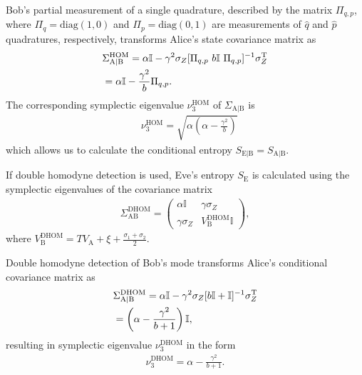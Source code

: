 \documentclass[%
reprint,
superscriptaddress,
 amsmath,amssymb,amsfonts,
 aps,
 pra,
 longbibliography
]{revtex4-2}
\newcommand{\ind}[1]{\mathrm{#1}}
\begin{document}
Bob’s partial measurement of a single quadrature, described by the matrix $\Pi_{q,p}$, where $\Pi_q=\ind{diag}(1,0)$ and $\Pi_p=\ind{diag}(0,1)$ are measurements of $\hat{q}$ and $\hat{p}$ quadratures, respectively, transforms Alice's state covariance matrix as~\cite{laudenbach2018continuous}
\begin{align}
    \label{eq:AB}
    &\Sigma_{\ind{A}|\ind{B}}^{\ind{HOM}}=\alpha\mathbb{I}-\gamma^2\sigma_Z[\Pi_{q,p}\ b\mathbb{I}\ \Pi_{q,p}]^{-1}\sigma_Z^{\ind T}\notag\\
    &=\alpha\mathbb{I}-\frac{\gamma^2}{b}\Pi_{q,p}.
\end{align}
The corresponding symplectic eigenvalue $\nu_3^{\ind{HOM}}$ of $\Sigma_{\ind{A}|\ind{B}}$ is
 \begin{align}
     \label{eq:nu3}
     &\nu_3^{\ind{HOM}}=\sqrt{\alpha\left(\alpha-\frac{\gamma^2}{b}\right)}
 \end{align}
which allows us to calculate the conditional entropy $S_{\ind{E}|\ind{B}}=S_{\ind{A}|\ind{B}}$. 

If double homodyne detection is used, Eve's entropy $S_{\ind{E}}$ is calculated using the symplectic eigenvalues of the covariance matrix
\begin{align}
\label{eq:Sigma_AB_dhom}
    \Sigma_{\ind{AB}}^{\ind{DHOM}}=\begin{pmatrix}
        \alpha\mathbb{I}&\gamma\sigma_Z\\
        \gamma\sigma_Z&V_{\ind{B}}^{\ind{DHOM}}\mathbb{I}
    \end{pmatrix},
\end{align}
where $V_{\ind{B}}^{\ind{DHOM}}=TV_{\ind{A}}+\xi+\frac{\sigma_1+\sigma_2}{2}$.

Double homodyne detection of Bob’s mode transforms Alice’s conditional covariance matrix as
\begin{align}
    \label{eq:AB_dhom}&\Sigma_{\ind{A}|\ind{B}}^{\ind{DHOM}}=
    \alpha\mathbb{I}-\gamma^2\sigma_Z[b\mathbb{I}+\mathbb{I}]^{-1}\sigma_Z^{\ind T}\notag\\&=\left(\alpha-\frac{\gamma^2}{b+1}\right)\mathbb{I},
\end{align}
resulting in symplectic eigenvalue $\nu_3^{\ind{DHOM}}$ in the form
\begin{align}
    \nu_3^{\ind{DHOM}}=\alpha-\frac{\gamma^2}{b+1}.
\end{align}
\end{document}
